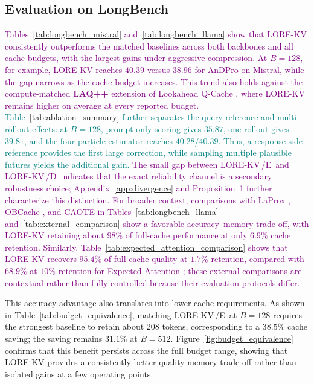 \documentclass{article} %
\newcommand{\lorekvE}{LORE-KV\,/E}
\newcommand{\lorekvD}{LORE-KV\,/D}
\begin{document}
\subsection{Evaluation on LongBench} \label{subsec:longbench}
\textcolor{purple}{Tables~\ref{tab:longbench_mistral} and~\ref{tab:longbench_llama} show that LORE-KV consistently outperforms the matched baselines across both backbones and all cache budgets, with the largest gains under aggressive compression. At $B=128$, for example, LORE-KV reaches $40.39$ versus $38.96$ for AnDPro on Mistral, while the gap narrows as the cache budget increases. This trend also holds against the compute-matched \textbf{LAQ++} extension of Lookahead Q-Cache \citep{wang2025lookahead}, where LORE-KV remains higher on average at every reported budget. \textcolor{teal}{Table~\ref{tab:ablation_summary} further separates the query-reference and multi-rollout effects: at $B=128$, prompt-only scoring gives $35.87$, one rollout gives $39.81$, and the four-particle estimator reaches $40.28$/$40.39$. Thus, a response-side reference provides the first large correction, while sampling multiple plausible futures yields the additional gain.} The small gap between \lorekvE\ and \lorekvD\ indicates that the exact reliability channel is a secondary robustness choice; Appendix~\ref{app:divergence} and Proposition~1 further characterize this distinction. For broader context, comparisons with LaProx \citep{mai2026reformulating}, OBCache \citep{gu2025obcache}, and CAOTE \citep{goel2025caote} in Tables~\ref{tab:longbench_llama} and~\ref{tab:external_comparison} show a favorable accuracy--memory trade-off, with LORE-KV retaining about $98\%$ of full-cache performance at only $6.9\%$ cache retention. Similarly, Table~\ref{tab:expected_attention_comparison} shows that LORE-KV recovers $95.4\%$ of full-cache quality at $1.7\%$ retention, compared with $68.9\%$ at $10\%$ retention for Expected Attention \citep{devoto2025expected}; these external comparisons are contextual rather than fully controlled because their evaluation protocols differ.}

This accuracy advantage also translates into lower cache requirements. As shown in Table~\ref{tab:budget_equivalence}, matching \lorekvE\ at $B=128$ requires the strongest baseline to retain about $208$ tokens, corresponding to a $38.5\%$ cache saving; the saving remains $31.1\%$ at $B=512$. Figure~\ref{fig:budget_equivalence} confirms that this benefit persists across the full budget range, showing that LORE-KV provides a consistently better quality-memory trade-off rather than isolated gains at a few operating points.
\end{document}
